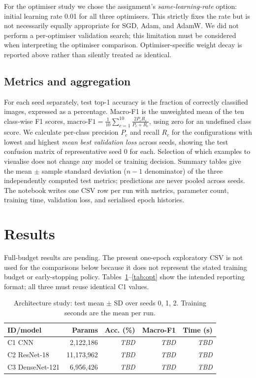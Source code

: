 \documentclass[conference,onecolumn]{IEEEtran}
\newcommand{\tbd}{\textit{TBD}}
\begin{document}
For the optimiser study we chose the assignment's
\emph{same-learning-rate} option: initial learning rate 0.01 for all three
optimisers. This strictly fixes the rate but is not necessarily equally
appropriate for SGD, Adam, and AdamW. We did not perform a per-optimiser
validation search; this limitation must be considered when interpreting
the optimiser comparison. Optimiser-specific weight decay is reported
above rather than silently treated as identical.

\subsection{Metrics and aggregation}
For each seed separately, test top-1 accuracy is the fraction of correctly
classified images, expressed as a percentage. Macro-F1 is the unweighted
mean of the ten class-wise F1 scores,
$\mathrm{macro\text{-}F1}=\frac{1}{10}\sum_{c=1}^{10}
\frac{2P_cR_c}{P_c+R_c}$, using zero for an undefined class score.
We calculate per-class precision $P_c$ and recall $R_c$ for the
configurations with lowest and highest \emph{mean best validation loss}
across seeds, showing the test confusion matrix of representative seed 0
for each. Selection of which examples to visualise does not change any
model or training decision. Summary tables give the mean $\pm$ sample
standard deviation ($n-1$ denominator) of the three independently
computed test metrics; predictions are never pooled across seeds.
The notebook writes one CSV row per run with metrics, parameter count,
training time, validation loss, and serialised epoch histories.

\section{Results}
Full-budget results are pending. The present one-epoch exploratory CSV is
not used for the comparisons below because it does not represent the stated
training budget or early-stopping policy. Tables~\ref{tab:arch}--\ref{tab:opt}
show the intended reporting format; all three must reuse identical C1 values.

\begin{table}[htbp]
\caption{Architecture study: test mean $\pm$ SD over seeds 0, 1, 2. Training seconds are the mean per run.}
\label{tab:arch}
\centering
\normalsize
\setlength{\tabcolsep}{8pt}
\begin{tabular}{@{}lrrrr@{}}
\toprule
ID/model & Params & Acc. (\%) & Macro-F1 & Time (s) \\
\midrule
C1 CNN & 2,122,186 & \tbd & \tbd & \tbd \\
C2 ResNet-18 & 11,173,962 & \tbd & \tbd & \tbd \\
C3 DenseNet-121 & 6,956,426 & \tbd & \tbd & \tbd \\
\bottomrule
\end{tabular}
\end{table}
\end{document}
